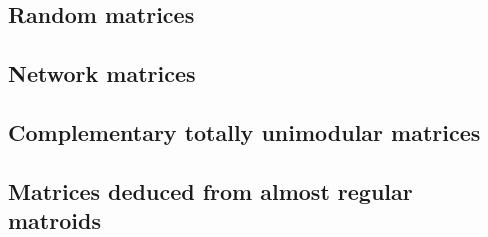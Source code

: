 \documentclass[12pt]{article}
\begin{document}
\subsection{Random matrices}

\subsection{Network matrices}

\subsection{Complementary totally unimodular matrices}

\subsection{Matrices deduced from almost regular matroids}




\end{document}
